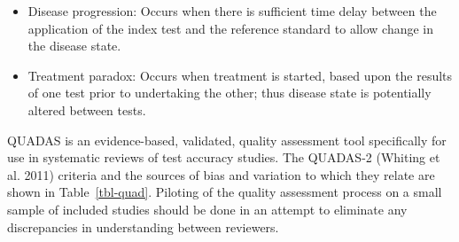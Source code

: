 \documentclass[
  11pt,
  a4paper,
  DIV=11,
  numbers=noendperiod]{scrreprt}
\begin{document}
\begin{itemize}
  \begin{itemize}
  \item
    Disease progression: Occurs when there is sufficient time delay
    between the application of the index test and the reference standard
    to allow change in the disease state.
  \item
    Treatment paradox: Occurs when treatment is started, based upon the
    results of one test prior to undertaking the other; thus disease
    state is potentially altered between tests.
  \end{itemize}
\end{itemize}

QUADAS is an evidence-based, validated, quality assessment tool
specifically for use in systematic reviews of test accuracy studies. The
QUADAS-2 (Whiting et al. 2011) criteria and the sources of bias and
variation to which they relate are shown in Table~\ref{tbl-quad}.
Piloting of the quality assessment process on a small sample of included
studies should be done in an attempt to eliminate any discrepancies in
understanding between reviewers.
\end{document}
